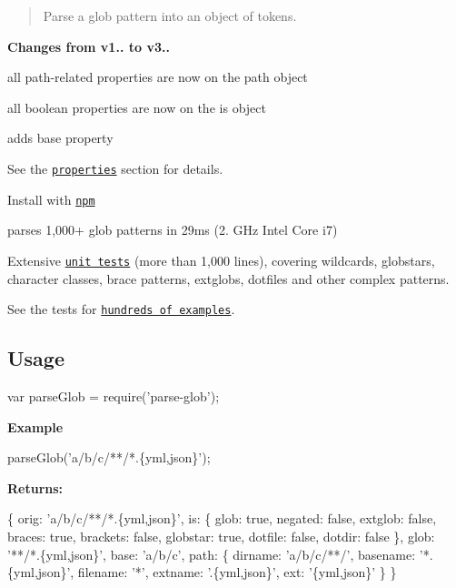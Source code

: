\begin{quote}
Parse a glob pattern into an object of tokens. \end{quote}


{\bfseries Changes from v1.. to v3..}


\begin{DoxyItemize}
\item all path-\/related properties are now on the {\ttfamily path} object
\item all boolean properties are now on the {\ttfamily is} object
\item adds {\ttfamily base} property
\end{DoxyItemize}

See the \href{#properties}{\tt properties} section for details.

Install with \href{https://www.npmjs.com/}{\tt npm}





\begin{DoxyItemize}
\item parses 1,000+ glob patterns in 29ms (2. G\+Hz Intel Core i7)
\item Extensive \href{./test.js}{\tt unit tests} (more than 1,000 lines), covering wildcards, globstars, character classes, brace patterns, extglobs, dotfiles and other complex patterns.
\end{DoxyItemize}

See the tests for \href{./test.js}{\tt hundreds of examples}.

\subsection*{Usage}


\begin{DoxyCode}
var parseGlob = require('parse-glob');
\end{DoxyCode}


{\bfseries Example}


\begin{DoxyCode}
parseGlob('a/b/c/**/*.\{yml,json\}');
\end{DoxyCode}


{\bfseries Returns\+:}


\begin{DoxyCode}
\{ orig: 'a/b/c/**/*.\{yml,json\}',
  is:
   \{ glob: true,
     negated: false,
     extglob: false,
     braces: true,
     brackets: false,
     globstar: true,
     dotfile: false,
     dotdir: false \},
  glob: '**/*.\{yml,json\}',
  base: 'a/b/c',
  path:
   \{ dirname: 'a/b/c/**/',
     basename: '*.\{yml,json\}',
     filename: '*',
     extname: '.\{yml,json\}',
     ext: '\{yml,json\}' \} \}
\end{DoxyCode}


